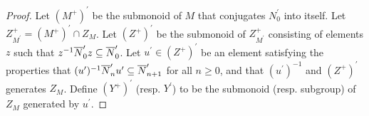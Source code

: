 \documentclass[10pt]{amsart}
\begin{document}
\begin{proof}
Let $(M^{+})^{\prime}$ be the submonoid of $M$ that conjugates $N_{0}^{\prime}$ into itself. Let $Z_{M^{\prime}}^{+}=(M^{+})^{\prime}\cap Z_{M}$. Let $(Z^{+})^{\prime}$ be the submonoid of $Z_{M^{\prime}}^{+}$ consisting of elements $z$ such that $z^{-1}\overline{N}_{0}^{\prime}z\subseteq \overline{N}_{0}^{\prime}$. Let $u^{\prime}\in (Z^{+})^{\prime}$ be an element satisfying the properties that $(u^{\prime})^{-1}\overline{N}^{\prime}_{n}u^{\prime}\subseteq \overline{N}^{\prime}_{n+1}$ for all $n\geq 0$, and that $(u^{\prime})^{-1}$ and $(Z^{+})^{\prime}$ generates $Z_{M}$. Define $(Y^{+})^{\prime}$ (resp. $Y^{\prime}$) to be the submonoid (resp. subgroup) of $Z_{M}$ generated by $u^{\prime}$. 

\end{proof}
\end{document}
